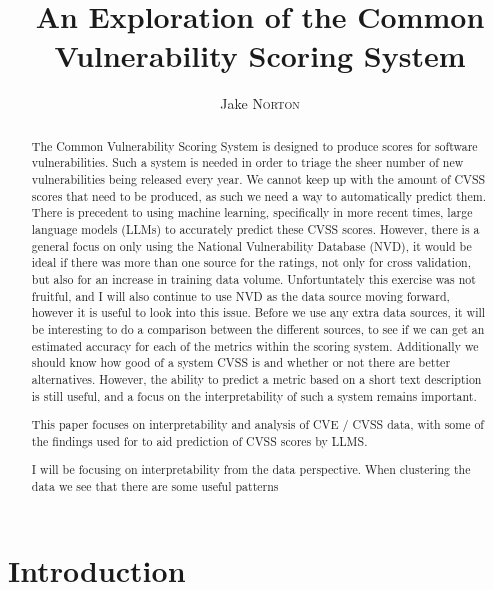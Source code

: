 \documentclass[12pt]{article}
\title{An Exploration of the Common Vulnerability Scoring System}
\author{Jake \textsc{Norton}}
\begin{document}
\maketitle

\begin{abstract}

	The Common Vulnerability Scoring System is designed to produce scores for software
	vulnerabilities. Such a system is needed in order to triage the sheer number of new
	vulnerabilities being released every year. We cannot keep up with the amount of CVSS scores that
	need to be produced, as such we need a way to automatically predict them. There is precedent to
	using machine learning, specifically in more recent times, large language models (LLMs) to
	accurately predict these CVSS scores. However, there is a general focus on only using the
	National Vulnerability Database (NVD), it would be ideal if there was more than one source for
	the ratings, not only for cross validation, but also for an increase in training data volume.
	Unfortuntately this exercise was not fruitful, and I will also continue to use NVD as the data
	source moving forward, however it is useful to look into this issue.
	Before we use any extra data sources, it will be interesting to do a comparison between the
	different sources, to see if we can get an estimated accuracy for each of the metrics within the
	scoring system. Additionally we should know how good of a system CVSS is and whether or not
	there are better alternatives. However, the ability to predict a metric based on a short text
	description is still useful, and a focus on the interpretability of such a system remains
	important.

	This paper focuses on interpretability and analysis of CVE / CVSS data, with some of the
	findings used for to aid prediction of CVSS scores by LLMS.

	I will be focusing on interpretability from the data perspective. When clustering the
	data we see that there are some useful patterns

\end{abstract}


\section{Introduction}
\end{document}
